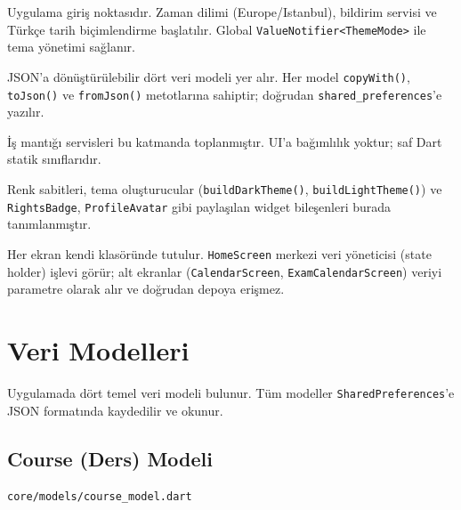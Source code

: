 \documentclass[12pt,a4paper]{article}
\begin{document}
\begin{description}[leftmargin=2cm, style=nextline]
    \item[\texttt{main.dart}]
        Uygulama giriş noktasıdır. Zaman dilimi (Europe/Istanbul), bildirim servisi ve Türkçe tarih biçimlendirme başlatılır. Global \texttt{ValueNotifier<ThemeMode>} ile tema yönetimi sağlanır.

    \item[\texttt{core/models/}]
        JSON'a dönüştürülebilir dört veri modeli yer alır. Her model \texttt{copyWith()}, \texttt{toJson()} ve \texttt{fromJson()} metotlarına sahiptir; doğrudan \texttt{shared\_preferences}'e yazılır.

    \item[\texttt{core/services/}]
        İş mantığı servisleri bu katmanda toplanmıştır. UI'a bağımlılık yoktur; saf Dart statik sınıflarıdır.

    \item[\texttt{core/theme/}]
        Renk sabitleri, tema oluşturucular (\texttt{buildDarkTheme()}, \texttt{buildLightTheme()}) ve \texttt{RightsBadge}, \texttt{ProfileAvatar} gibi paylaşılan widget bileşenleri burada tanımlanmıştır.

    \item[\texttt{features/}]
        Her ekran kendi klasöründe tutulur. \texttt{HomeScreen} merkezi veri yöneticisi (state holder) işlevi görür; alt ekranlar (\texttt{CalendarScreen}, \texttt{ExamCalendarScreen}) veriyi parametre olarak alır ve doğrudan depoya erişmez.
\end{description}

\section{Veri Modelleri}

Uygulamada dört temel veri modeli bulunur. Tüm modeller \texttt{SharedPreferences}'e JSON formatında kaydedilir ve okunur.

\subsection{Course (Ders) Modeli}
\texttt{core/models/course\_model.dart}
\end{document}

